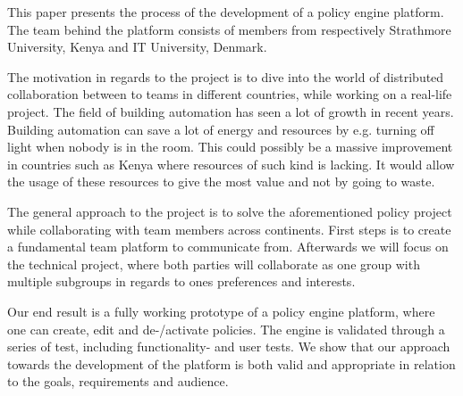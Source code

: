This paper presents the process of the development of a policy engine platform. The team behind the platform consists of members from respectively Strathmore University, Kenya and IT University, Denmark. 

The motivation in regards to the project is to dive into the world of distributed collaboration between to teams in different countries, while working on a real-life project. The field of building automation has seen a lot of growth in recent years. Building automation can save a lot of energy and resources by e.g. turning off light when nobody is in the room. This could possibly be a massive improvement in countries such as Kenya where resources of such kind is lacking. It would allow the usage of these resources to give the most value and not by going to waste.

The general approach to the project is to solve the aforementioned policy project while collaborating with team members across continents. First steps is to create a fundamental team platform to communicate from. Afterwards we will focus on the technical project, where both parties will collaborate as one group with multiple subgroups in regards to ones preferences and interests.

Our end result is a fully working prototype of a policy engine platform, where one can create, edit and de-/activate policies. The engine is validated through a series of test, including functionality- and user tests. We show that our approach towards the development of the platform is both valid and appropriate in relation to the goals, requirements and audience.